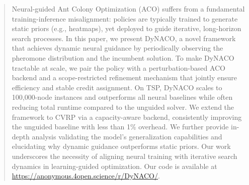 \documentclass[sigconf,review]{acmart}
\begin{document}
\begin{abstract}


Neural-guided Ant Colony Optimization (ACO) suffers from a fundamental training-inference misalignment: policies are typically trained to generate static priors (e.g., heatmaps), yet deployed to guide iterative, long-horizon search processes. In this paper, we present DyNACO, a novel framework that achieves dynamic neural guidance by periodically observing the pheromone distribution and the incumbent solution. To make DyNACO tractable at scale, we pair the policy with a perturbation-based ACO backend and a scope-restricted refinement mechanism that jointly ensure efficiency and stable credit assignment. On TSP, DyNACO scales to 100,000-node instances and outperforms all neural baselines while often reducing total runtime compared to the unguided solver. We extend the framework to CVRP via a capacity-aware backend, consistently improving the unguided baseline with less than 1\% overhead. We further provide in-depth analysis validating the model's generalization capabilities and elucidating why dynamic guidance outperforms static priors. Our work underscores the necessity of aligning neural training with iterative search dynamics in learning-guided optimization. Our code is available at \url{https://anonymous.4open.science/r/DyNACO/}.
\end{abstract}
\end{document}
